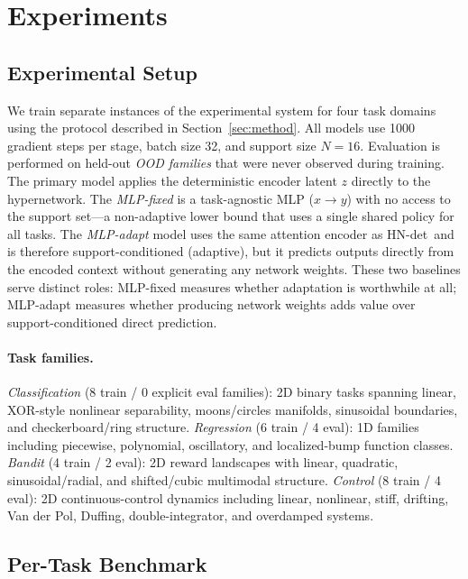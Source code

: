\section{Experiments}\label{sec:experiments}

\subsection{Experimental Setup}

We train separate instances of the experimental system for four task domains using the protocol described in Section~\ref{sec:method}.
All models use 1000 gradient steps per stage, batch size 32, and support size $N{=}16$.
Evaluation is performed on held-out \emph{OOD families} that were never observed during training.
The primary model applies the deterministic encoder latent $z$ directly to the hypernetwork.
The \emph{MLP-fixed} is a task-agnostic MLP ($x \to y$) with no access to the support set---a non-adaptive lower bound that uses a single shared policy for all tasks.
The \emph{MLP-adapt} model uses the same attention encoder as HN-det\ and is therefore support-conditioned (adaptive), but it predicts outputs directly from the encoded context without generating any network weights.
These two baselines serve distinct roles: MLP-fixed measures whether adaptation is worthwhile at all; MLP-adapt measures whether producing network weights adds value over support-conditioned direct prediction.

\paragraph{Task families.}
\emph{Classification} (8 train / 0 explicit eval families): 2D binary tasks spanning linear, XOR-style nonlinear separability, moons/circles manifolds, sinusoidal boundaries, and checkerboard/ring structure.
\emph{Regression} (6 train / 4 eval): 1D families including piecewise, polynomial, oscillatory, and localized-bump function classes.
\emph{Bandit} (4 train / 2 eval): 2D reward landscapes with linear, quadratic, sinusoidal/radial, and shifted/cubic multimodal structure.
\emph{Control} (8 train / 4 eval): 2D continuous-control dynamics including linear, nonlinear, stiff, drifting, Van der Pol, Duffing, double-integrator, and overdamped systems.

\subsection{Per-Task Benchmark}

